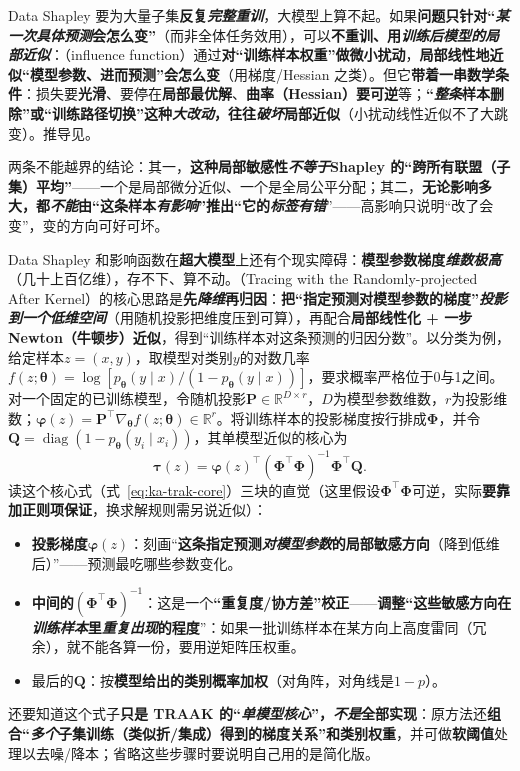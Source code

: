 Data Shapley 要为大量子集\textbf{反复\emph{完整重训}}，大模型上算不起。如果\textbf{问题只针对“\emph{某一次具体预测}会怎么变”}（而非全体任务效用），可以\textbf{不重训、用\emph{训练后模型的局部近似}}：（influence function）通过\textbf{对“训练样本权重”做微小扰动}，\textbf{局部线性地近似“模型参数、进而预测”会怎么变}（用梯度/Hessian 之类）。但它\textbf{带着一串数学条件}：损失要\textbf{光滑}、要停在\textbf{局部最优解}、\textbf{曲率（Hessian）要可逆}等；\textbf{“\emph{整条}样本删除”或“训练路径切换”这种\emph{大改动}，往往\emph{破坏}局部近似}（小扰动线性近似不了大跳变）。推导见。

两条不能越界的结论：其一，\textbf{这种局部敏感性\emph{不等于}Shapley 的“跨所有联盟（子集）平均”}——一个是局部微分近似、一个是全局公平分配；其二，\textbf{无论影响多大，都\emph{不能}由“这条样本\emph{有影响}”推出“它的\emph{标签有错}}”——高影响只说明“改了会变”，变的方向可好可坏。

Data Shapley 和影响函数在\textbf{超大模型}上还有个现实障碍：\textbf{模型参数梯度\emph{维数极高}}（几十上百亿维），存不下、算不动。（Tracing with the Randomly-projected After Kernel）的核心思路是\textbf{先\emph{降维}再归因}：\textbf{把“指定预测对模型参数的梯度”\emph{投影到一个低维空间}}（用随机投影把维度压到可算），再配合\textbf{局部线性化 + 一步 Newton（牛顿步）近似}，得到“训练样本对这条预测的归因分数”。以分类为例，给定样本$z=(x,y)$，取模型对类别$y$的对数几率$f(z;\bm\theta)=\log[p_{\bm\theta}(y\mid x)/(1-p_{\bm\theta}(y\mid x))]$，要求概率严格位于0与1之间。对一个固定的已训练模型，令随机投影$\bm P\in\mathbb R^{D\times r}$，$D$为模型参数维数，$r$为投影维数；$\bm\varphi(z)=\bm P^\top\nabla_{\bm\theta}f(z;\bm\theta)\in\mathbb R^r$。将训练样本的投影梯度按行排成$\bm\Phi$，并令$\bm Q=\operatorname{diag}(1-p_{\bm\theta}(y_i\mid x_i))$，其单模型近似的核心为
\begin{equation}
  \bm\tau(z)
  =\bm\varphi(z)^\top
   (\bm\Phi^\top\bm\Phi)^{-1}\bm\Phi^\top\bm Q.
  \label{eq:ka-trak-core}
\end{equation}
读这个核心式（式~\eqref{eq:ka-trak-core}）三块的直觉（这里假设$\bm{\Phi}^{\top}\bm{\Phi}$可逆，实际\textbf{要靠加正则项保证}，换求解规则需另说近似）：
\begin{itemize}\item \textbf{投影梯度$\bm{\varphi}(z)$}：刻画“\textbf{这条指定预测\emph{对模型参数}的局部敏感方向}（降到低维后）”——预测最吃哪些参数变化。\item \textbf{中间的$(\bm{\Phi}^{\top}\bm{\Phi})^{-1}$}：这是一个\textbf{“重复度/协方差”校正}——\textbf{调整“这些敏感方向在\emph{训练样本}里\emph{重复出现}的程度}”：如果一批训练样本在某方向上高度雷同（冗余），就不能各算一份，要用逆矩阵压权重。\item 最后的$\bm Q$：按\textbf{模型给出的类别概率加权}（对角阵，对角线是$1-p$）。\end{itemize}
还要知道这个式子\textbf{只是 TRAAK 的“\emph{单模型核心}”，\emph{不是}全部实现}：原方法还\textbf{组合“\emph{多个}子集训练（类似折/集成）得到的梯度关系”和类别权重}，并可做\textbf{软阈值}处理以去噪/降本；省略这些步骤时要说明自己用的是简化版。

